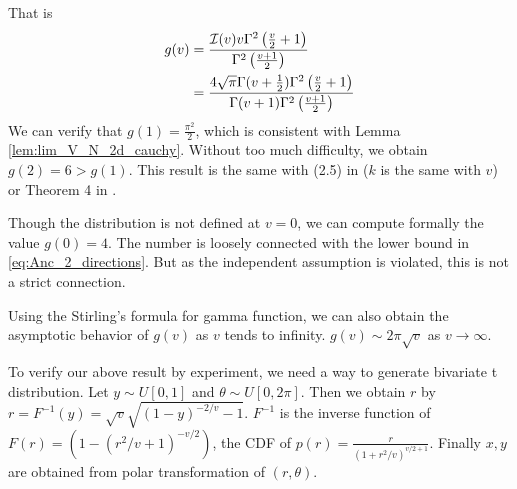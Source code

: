 \documentclass{article}
\begin{document}
That is
\begin{align}
    g(v) &= \frac{\mathcal{I}(v) v \Gamma^2\left(\frac{v}{2}+1\right)}
    {\Gamma^2 \left(\frac{v+1}{2} \right)} \notag \\
    &= \frac{4\sqrt{\pi}
    \Gamma(v+\frac{1}{2})\Gamma^2\left(\frac{v}{2}+1\right)}
    {\Gamma(v+1)\Gamma^2 \left(\frac{v+1}{2} \right)}
    \label{eq:def_g_v}
\end{align}
We can verify that $g(1) = \frac{\pi^2}{2}$,
which is consistent with Lemma \ref{lem:lim_V_N_2d_cauchy}.
Without too much difficulty, we obtain $g(2)=6>g(1)$.
This result is the same with (2.5) in \cite{carnal1970konvexe}
($k$ is the same with $v$) or Theorem 4 in \cite{davis1987convex}.

Though the distribution is not defined at $v=0$,
we can compute formally the value $g(0)=4$.
The number is loosely connected with the lower bound in \eqref{eq:Anc_2_directions}.
But as the independent assumption is violated, this is not
a strict connection.

Using the Stirling's formula for gamma function, we can also
obtain the asymptotic behavior of $g(v)$
as $v$ tends to infinity.
$g(v) \sim 2\pi \sqrt{v}$
as $v\to \infty$.

To verify our above result by experiment,
we need a way
to generate bivariate t distribution.
Let $y \sim U[0,1]$ and $\theta \sim
U[0, 2\pi]$. Then we obtain $r$
by $r=F^{-1}(y) = \sqrt{v}\sqrt{(1-y)^{-2/v}-1}$.
$F^{-1}$ is the inverse function
of $F(r)=
\left(1-(r^2/v+1)^{-v/2}
\right)$, the CDF of
$p(r)= 
\frac{r}{(1+r^2/v)^{v/2 + 1}}$.
Finally $x,y$ are obtained from polar transformation
of $(r,\theta)$.
\end{document}
